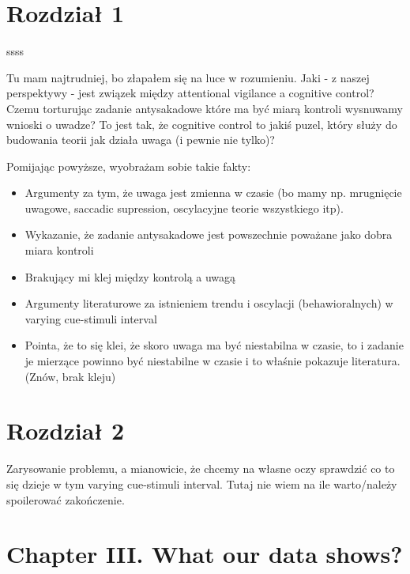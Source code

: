 \documentclass[
  man,draftall]{apa6}
\providecommand{\tightlist}{%
  \setlength{\itemsep}{0pt}\setlength{\parskip}{0pt}}
\begin{document}
\hypertarget{rozdziaux142-1}{%
\section{Rozdział 1}\label{rozdziaux142-1}}

ssss

Tu mam najtrudniej, bo złapałem się na luce w rozumieniu. Jaki - z naszej perspektywy - jest związek między attentional vigilance a cognitive control? Czemu torturując zadanie antysakadowe które ma być miarą kontroli wysnuwamy wnioski o uwadze? To jest tak, że cognitive control to jakiś puzel, który służy do budowania teorii jak działa uwaga (i pewnie nie tylko)?

Pomijając powyższe, wyobrażam sobie takie fakty:

\begin{itemize}
\tightlist
\item
  Argumenty za tym, że uwaga jest zmienna w czasie (bo mamy np. mrugnięcie uwagowe, saccadic supression, oscylacyjne teorie wszystkiego itp).
\item
  Wykazanie, że zadanie antysakadowe jest powszechnie poważane jako dobra miara kontroli
\item
  Brakujący mi klej między kontrolą a uwagą
\item
  Argumenty literaturowe za istnieniem trendu i oscylacji (behawioralnych) w varying cue-stimuli interval
\item
  Pointa, że to się klei, że skoro uwaga ma być niestabilna w czasie, to i zadanie je mierzące powinno być niestabilne w czasie i to właśnie pokazuje literatura. (Znów, brak kleju)
\end{itemize}

\hypertarget{rozdziaux142-2}{%
\section{Rozdział 2}\label{rozdziaux142-2}}

Zarysowanie problemu, a mianowicie, że chcemy na własne oczy sprawdzić co to się dzieje w tym varying cue-stimuli interval.
Tutaj nie wiem na ile warto/należy spoilerować zakończenie.

\hypertarget{chapter-iii.-what-our-data-shows}{%
\section{Chapter III. What our data shows?}\label{chapter-iii.-what-our-data-shows}}
\end{document}
